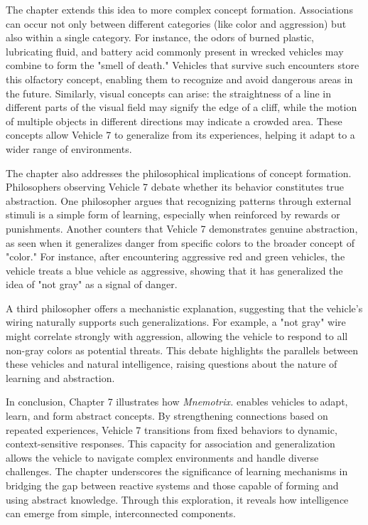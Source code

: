 \documentclass{article}
\begin{document}
    The chapter extends this idea to more complex concept formation. Associations can occur not only between different categories (like color and aggression) but also within a single category. For instance, the odors of burned plastic, lubricating fluid, and battery acid commonly present in wrecked vehicles may combine to form the "smell of death." Vehicles that survive such encounters store this olfactory concept, enabling them to recognize and avoid dangerous areas in the future. Similarly, visual concepts can arise: the straightness of a line in different parts of the visual field may signify the edge of a cliff, while the motion of multiple objects in different directions may indicate a crowded area. These concepts allow Vehicle 7 to generalize from its experiences, helping it adapt to a wider range of environments.  

    The chapter also addresses the philosophical implications of concept formation. Philosophers observing Vehicle 7 debate whether its behavior constitutes true abstraction. One philosopher argues that recognizing patterns through external stimuli is a simple form of learning, especially when reinforced by rewards or punishments. Another counters that Vehicle 7 demonstrates genuine abstraction, as seen when it generalizes danger from specific colors to the broader concept of "color." For instance, after encountering aggressive red and green vehicles, the vehicle treats a blue vehicle as aggressive, showing that it has generalized the idea of "not gray" as a signal of danger.  

    A third philosopher offers a mechanistic explanation, suggesting that the vehicle's wiring naturally supports such generalizations. For example, a "not gray" wire might correlate strongly with aggression, allowing the vehicle to respond to all non-gray colors as potential threats. This debate highlights the parallels between these vehicles and natural intelligence, raising questions about the nature of learning and abstraction.  

    In conclusion, Chapter 7 illustrates how \textit{Mnemotrix.} enables vehicles to adapt, learn, and form abstract concepts. By strengthening connections based on repeated experiences, Vehicle 7 transitions from fixed behaviors to dynamic, context-sensitive responses. This capacity for association and generalization allows the vehicle to navigate complex environments and handle diverse challenges. The chapter underscores the significance of learning mechanisms in bridging the gap between reactive systems and those capable of forming and using abstract knowledge. Through this exploration, it reveals how intelligence can emerge from simple, interconnected components.
\end{document}
